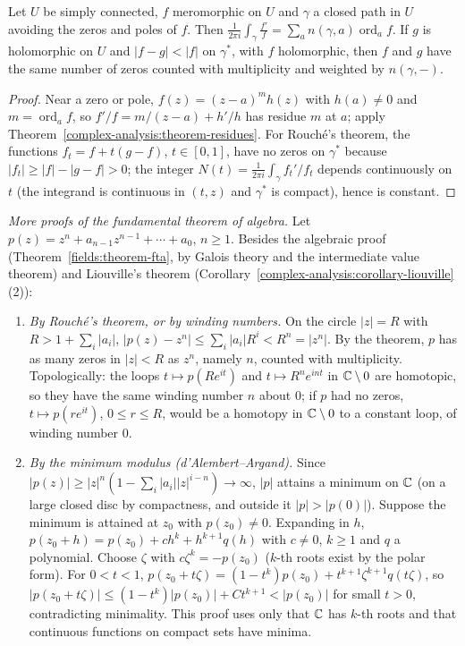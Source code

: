 \begin{theorem}\label{complex-analysis:theorem-argument-principle}
Let $U$ be simply connected, $f$ meromorphic on $U$ and $\gamma$ a closed path in $U$ avoiding the zeros and poles of $f$. Then
$\frac{1}{2\pi i}\int_\gamma\frac{f'}{f} = \sum_a n(\gamma, a)\operatorname{ord}_af$. If $g$ is holomorphic on $U$ and $|f - g| < |f|$ on $\gamma^*$, with $f$ holomorphic, then $f$ and $g$ have the same number of
zeros counted with multiplicity and weighted by $n(\gamma, -)$.
\end{theorem}

\begin{proof}
Near a zero or pole, $f(z) = (z - a)^{m}h(z)$ with $h(a) \neq 0$ and $m = \operatorname{ord}_af$, so $f'/f = m/(z - a) + h'/h$ has residue $m$ at $a$; apply
Theorem~\ref{complex-analysis:theorem-residues}. For Rouch\'e's theorem, the functions $f_t = f + t(g - f)$, $t \in [0, 1]$, have no zeros on $\gamma^*$ because $|f_t| \geq |f| - |g - f| > 0$; the integer
$N(t) = \frac{1}{2\pi i}\int_\gamma f_t'/f_t$ depends continuously on $t$ (the integrand is continuous in $(t, z)$ and $\gamma^*$ is compact), hence is constant.
\end{proof}

\begin{example}\label{complex-analysis:example-fta-proofs}
\emph{More proofs of the fundamental theorem of algebra.} Let $p(z) = z^n + a_{n-1}z^{n-1} + \cdots + a_0$, $n \geq 1$. Besides the algebraic proof (Theorem~\ref{fields:theorem-fta}, by Galois theory and the
intermediate value theorem) and Liouville's theorem (Corollary~\ref{complex-analysis:corollary-liouville}(2)):
\begin{enumerate}
\item \emph{By Rouch\'e's theorem, or by winding numbers.} On the circle $|z| = R$ with $R > 1 + \sum_i|a_i|$, $|p(z) - z^n| \leq \sum_i|a_i|R^i < R^n = |z^n|$. By the theorem, $p$ has as many zeros in
$|z| < R$ as $z^n$, namely $n$, counted with multiplicity. Topologically: the loops $t \mapsto p(Re^{it})$ and $t \mapsto R^ne^{int}$ in $\mathbb{C} \setminus 0$ are homotopic, so they have the same winding
number $n$ about $0$; if $p$ had no zeros, $t \mapsto p(re^{it})$, $0 \leq r \leq R$, would be a homotopy in $\mathbb{C} \setminus 0$ to a constant loop, of winding number $0$.
\item \emph{By the minimum modulus (d'Alembert--Argand).} Since $|p(z)| \geq |z|^n(1 - \sum_i|a_i||z|^{i-n}) \to \infty$, $|p|$ attains a minimum on $\mathbb{C}$ (on a large closed disc by compactness, and outside it
$|p| > |p(0)|$). Suppose the minimum is attained at $z_0$ with $p(z_0) \neq 0$. Expanding in $h$, $p(z_0 + h) = p(z_0) + ch^k + h^{k+1}q(h)$ with $c \neq 0$, $k \geq 1$ and $q$ a polynomial. Choose
$\zeta$ with $c\zeta^k = -p(z_0)$ ($k$-th roots exist by the polar form). For $0 < t < 1$, $p(z_0 + t\zeta) = (1 - t^k)p(z_0) + t^{k+1}\zeta^{k+1}q(t\zeta)$, so
$|p(z_0 + t\zeta)| \leq (1 - t^k)|p(z_0)| + Ct^{k+1} < |p(z_0)|$ for small $t > 0$, contradicting minimality. This proof uses only that $\mathbb{C}$ has $k$-th roots and that continuous functions on compact sets have
minima.
\end{enumerate}
\end{example}


